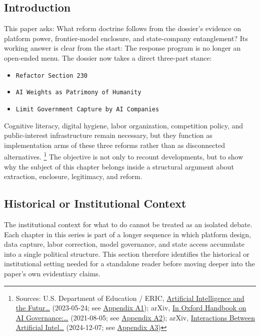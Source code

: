 \documentclass[
  american,
  11pt,
  letterpaper,
]{article}
\providecommand{\tightlist}{%
  \setlength{\itemsep}{0pt}\setlength{\parskip}{0pt}}
\begin{document}
\subsection{Introduction}\label{introduction}

This paper asks: What reform doctrine follows from the dossier's
evidence on platform power, frontier-model enclosure, and state-company
entanglement? Its working answer is clear from the start: The response
program is no longer an open-ended menu. The dossier now takes a direct
three-part stance:

\begin{itemize}
\tightlist
\item
  \texttt{Refactor\ Section\ 230}
\item
  \texttt{AI\ Weights\ as\ Patrimony\ of\ Humanity}
\item
  \texttt{Limit\ Government\ Capture\ by\ AI\ Companies}
\end{itemize}

Cognitive literacy, digital hygiene, labor organization, competition
policy, and public-interest infrastructure remain necessary, but they
function as implementation arms of these three reforms rather than as
disconnected alternatives. \footnote{Sources: U.S. Department of
  Education / ERIC, \href{https://eric.ed.gov/?id=ED631097}{Artificial
  Intelligence and the Futur\ldots{}} (2023-05-24; see
  \hyperref[appendix-a1-artificial-intelligence-and-the-future-of-teaching-and-learning-insights-and-recommendations]{Appendix
  A1}); arXiv, \href{https://arxiv.org/abs/2108.07700}{In Oxford
  Handbook on AI Governance:\ldots{}} (2021-08-05; see
  \hyperref[appendix-a2-in-oxford-handbook-on-ai-governance-the-role-of-workers-in-ai-ethics-and-governance]{Appendix
  A2}); arXiv, \href{https://arxiv.org/abs/2412.05761}{Interactions
  Between Artificial Intel\ldots{}} (2024-12-07; see
  \hyperref[appendix-a3-interactions-between-artificial-intelligence-and-digital-public-infrastructure-concepts-benefits-and-challenges]{Appendix
  A3})} The objective is not only to recount developments, but to show
why the subject of this chapter belongs inside a structural argument
about extraction, enclosure, legitimacy, and reform.

\subsection{Historical or Institutional
Context}\label{historical-or-institutional-context}

The institutional context for what to do cannot be treated as an
isolated debate. Each chapter in this series is part of a longer
sequence in which platform design, data capture, labor correction, model
governance, and state access accumulate into a single political
structure. This section therefore identifies the historical or
institutional setting needed for a standalone reader before moving
deeper into the paper's own evidentiary claims.
\end{document}
